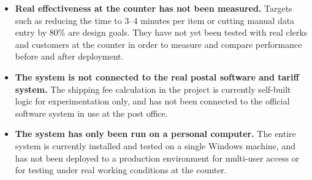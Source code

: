 \begin{itemize}
    \item \textbf{Real effectiveness at the counter has not been measured.} Targets such as reducing the time to 3--4 minutes per item or cutting manual data entry by 80\% are design goals. They have not yet been tested with real clerks and customers at the counter in order to measure and compare performance before and after deployment.

    \item \textbf{The system is not connected to the real postal software and tariff system.} The shipping fee calculation in the project is currently self-built logic for experimentation only, and has not been connected to the official software system in use at the post office.

    \item \textbf{The system has only been run on a personal computer.} The entire system is currently installed and tested on a single Windows machine, and has not been deployed to a production environment for multi-user access or for testing under real working conditions at the counter.
\end{itemize}
